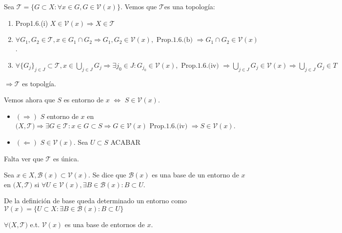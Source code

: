 \begin{dem}
  Sea $ \mathcal{T} = \{ G \subset X :\forall x \in G, G \in \mathcal{V}(x) \}$. Vemos que $\mathcal{T}$es una topología:
  \begin{enumerate}[label=(\roman*)]
    \item Prop1.6.(i) $X \in \mathcal{V}(x) \Rightarrow X \in \mathcal{T}$
    \item $\forall G_{1},G_{2} \in \mathcal{T}, x \in G_{1} \cap G_{2} \Rightarrow G_{1},G_{2} \in \mathcal{V}(x), \text{ Prop.1.6.(b) } \Rightarrow G_{1} \cap G_{2} \in \mathcal{V}(x)$.
    \item $\forall \{ G_{j} \}_{j \in J} \subset \mathcal{T}, x \in \bigcup_{j \in J} G_{j} \Rightarrow \exists j_{0} \in J : G_{j_{0}} \in \mathcal{V}(x), \text{ Prop.1.6.(iv) } \Rightarrow \bigcup_{j \in J} G_{j} \in \mathcal{V}(x) \Rightarrow \bigcup_{j \in J} G_{j} \in T$
  \end{enumerate}
$\Rightarrow \mathcal{T} $ es topolgía.

Vemos ahora que $S$ es entorno de $x$ $\Leftrightarrow$ $ S \in \mathcal{V}(x)$.

\begin{itemize}
  \item $(\Rightarrow)$ $S$ entorno de $x$ en $\big( X, \mathcal{T} \big) \Rightarrow \exists G \in \mathcal{T}: x \in G \subset S \Rightarrow G \in \mathcal{V}(x) \text{ Prop.1.6.(iv) } \Rightarrow S \in \mathcal{V}(x)$. 
  \item $(\Leftarrow)$ $S \in \mathcal{V}(x)$. Sea $ U \subset S$ ACABAR
\end{itemize}
Falta ver que $\mathcal{T}$ es única.
\end{dem}

\begin{defn}
  Sea $ x \in X, \mathcal{B}(x) \subset \mathcal{V}(x)$. Se dice que $\mathcal{B}(x)$ es una base de un entorno de $x$ en $\big( X, \mathcal{T} \big)$ si $\forall U \in \mathcal{V}(x), \exists B \in \mathcal{B}(x): B \subset U$.
\end{defn}

\begin{obs}
  De la definición de base queda determinado un entorno como $ \mathcal{V}(x) = \{ U \subset X: \exists B \in \mathcal{B}(x): B \subset U \}$
\end{obs}

\begin{ejm}
  $\forall \big( X, \mathcal{T} \big)$ e.t. $\mathcal{V}(x)$ es una base de entornos de $x$.
\end{ejm}

